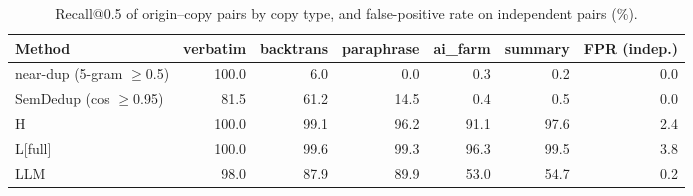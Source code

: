 \begin{table}[tbp]
\centering
\small
\caption{Recall@0.5 of origin--copy pairs by copy type, and false-positive rate on independent pairs (\%).}
\label{tab:deptypes}
\setlength{\tabcolsep}{4pt}
\begin{tabular}{lrrrrrr}
\toprule
Method & verbatim & backtrans & paraphrase & ai\_farm & summary & FPR (indep.) \\
\midrule
near-dup (5-gram $\geq$0.5) & 100.0 & 6.0 & 0.0 & 0.3 & 0.2 & 0.0 \\
SemDedup (cos $\geq$0.95) & 81.5 & 61.2 & 14.5 & 0.4 & 0.5 & 0.0 \\
H & 100.0 & 99.1 & 96.2 & 91.1 & 97.6 & 2.4 \\
L[full] & 100.0 & 99.6 & 99.3 & 96.3 & 99.5 & 3.8 \\
LLM & 98.0 & 87.9 & 89.9 & 53.0 & 54.7 & 0.2 \\
\bottomrule
\end{tabular}
\end{table}
